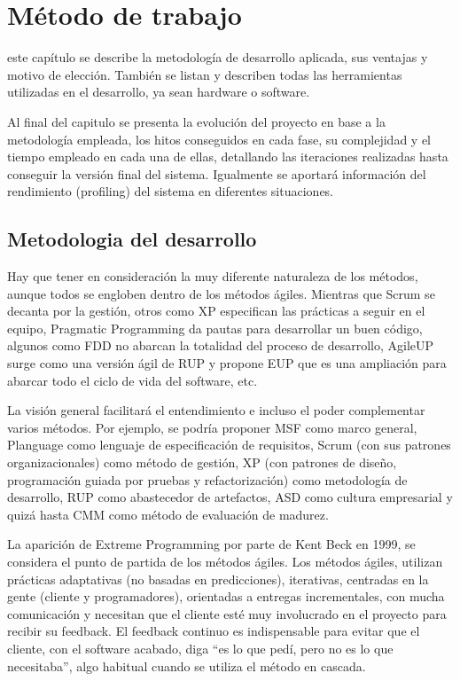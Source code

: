 \chapter{Método de trabajo}
\label{chap:metodo}

 este capítulo se describe la metodología de desarrollo aplicada, sus ventajas y motivo de elección. También se listan y describen todas las herramientas utilizadas en el desarrollo, ya sean hardware o software.

Al final del capitulo se presenta la evolución del proyecto en base a la metodología empleada, los hitos conseguidos en cada fase, su complejidad y el tiempo empleado en cada una de ellas, detallando las iteraciones realizadas hasta conseguir la versión final del sistema. Igualmente se aportará información del rendimiento (profiling) del sistema en diferentes situaciones.

\section{Metodologia del desarrollo}

Hay que tener en consideración la muy diferente naturaleza de los métodos, aunque todos se
engloben dentro de los métodos ágiles. Mientras que Scrum se decanta por la gestión, otros
como XP especifican las prácticas a seguir en el equipo, Pragmatic Programming da pautas
para desarrollar un buen código, algunos como FDD no abarcan la totalidad del proceso de
desarrollo, AgileUP surge como una versión ágil de RUP y propone EUP que es una
ampliación para abarcar todo el ciclo de vida del software, etc.

La visión general facilitará el entendimiento e incluso el poder complementar varios métodos.
Por ejemplo, se podría proponer MSF como marco general, Planguage como lenguaje de
especificación de requisitos, Scrum (con sus patrones organizacionales) como método de
gestión, XP (con patrones de diseño, programación guiada por pruebas y refactorización)
como metodología de desarrollo, RUP como abastecedor de artefactos, ASD como cultura
empresarial y quizá hasta CMM como método de evaluación de madurez.

La aparición de Extreme Programming por parte de Kent Beck en 1999, se considera el punto
de partida de los métodos ágiles. Los métodos ágiles, utilizan prácticas adaptativas (no
basadas en predicciones), iterativas, centradas en la gente (cliente y programadores),
orientadas a entregas incrementales, con mucha comunicación y necesitan que el cliente esté
muy involucrado en el proyecto para recibir su feedback. El feedback continuo es
indispensable para evitar que el cliente, con el software acabado, diga “es lo que pedí, pero
no es lo que necesitaba”, algo habitual cuando se utiliza el método en cascada.

